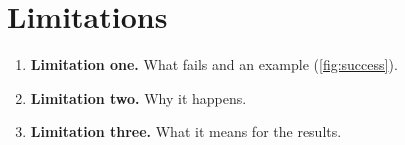 \section{Limitations}
\label{sec:discussion}

\begin{enumerate}
  \item \textbf{Limitation one.} What fails and an example
        (\cref{fig:success}).
  \item \textbf{Limitation two.} Why it happens.
  \item \textbf{Limitation three.} What it means for the results.
\end{enumerate}
